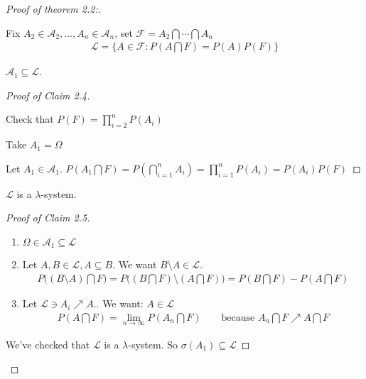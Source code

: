 \documentclass[11pt]{article}
\begin{document}
\vspace*{7mm}
\begin{proof}[Proof of theorem 2.2:]
    \,
    
    Fix $A_2 \in \mathcal{A}_{2}, \ldots ,A_n \in \mathcal{A}_{n}$, set 
    $\mathcal{F} = A_2 \bigcap \cdots \bigcap A_n$
    \begin{align*}
        \mathcal{L} = \{ A \in \mathcal{F}: P(A \bigcap F) = P(A)P(F) \}
    \end{align*}
    \begin{claim}
        $\mathcal{A}_1 \subseteq \mathcal{L}$.
        \begin{proof}[Proof of Claim 2.4]
            \,

            Check that $P(F) = \prod_{i=2}^{n}P(A_{i}) $

            Take $A_1 = \Omega$

            Let $A_1 \in \mathcal{A}_{1}$. $P(A_{1} \bigcap F) = P(\bigcap_{i=1}^{n}A_{i})
            = \prod_{i=1}^{n}P(A_{i}) = P(A_{i})P(F) $
        \end{proof}
    \end{claim}
    \begin{claim}
        $\mathcal{L}$ is a $\lambda$-system.
        \begin{proof}[Proof of Claim 2.5]
            \,

            \begin{enumerate}
                \item $\Omega \in \mathcal{A}_{1} \subseteq \mathcal{L}$
                \item Let $A,B \in \mathcal{L}, A \subseteq B$. We want $B\setminus A \in \mathcal{L}$.
                \begin{align*}
                    P\Big((B\setminus A) \bigcap F\Big) = P\Big((B \bigcap F)\setminus(A \bigcap F)\Big)
                    = P(B \bigcap F) - P(A \bigcap F)
                \end{align*}
                \item Let $\mathcal{L} \ni A_{i} \nearrow A.$. We want: $A \in \mathcal{L}$
                \begin{align*}
                    P(A\bigcap F) = \lim_{n \to \infty}P(A_n \bigcap F) \qquad \text{because }
                    A_n \bigcap F \nearrow A\bigcap F
                \end{align*}
            \end{enumerate}
            We've checked that $\mathcal{L}$ is a $\lambda$-system. So $\sigma(A_1) \subseteq \mathcal{L}$


\end{proof}
\end{claim}
\end{proof}
\end{document}
